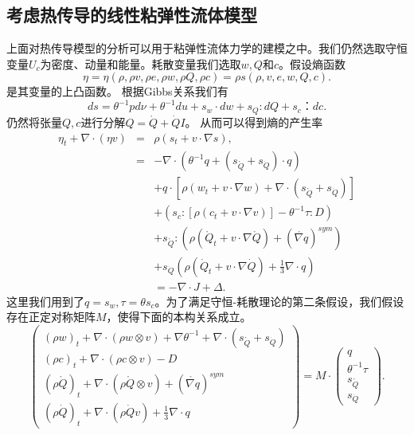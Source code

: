 \documentclass{article}
\begin{document}
\subsection{考虑热传导的线性粘弹性流体模型}
上面对热传导模型的分析可以用于粘弹性流体力学的建模之中。我们仍然选取守恒变量$U_c$为密度、动量和能量。耗散变量我们选取$w,Q$和$c$。假设熵函数
\begin{equation*}
	\eta = \eta (\rho,\rho v,\rho e,\rho w,\rho Q,\rho c) = \rho s(\rho,v,e,w,Q,c).
\end{equation*}
是其变量的上凸函数。
根据Gibbs关系我们有
\begin{equation*}
			ds = \theta^{-1} pd\nu + \theta^{-1} du + s_w \cdot dw + s_Q : d Q+ s_c ：dc.
\end{equation*}
仍然将张量$Q,c$进行分解$Q = \mathring{Q} +\dot{Q}I$。
从而可以得到熵的产生率
\begin{eqnarray*}
		\eta_t + \nabla \cdot (\eta v) &=& \rho (s_t + v \cdot \nabla s), \\
		&=& -\nabla \cdot (\theta^{-1} q + (s_{\mathring{{Q}}}+s_{\dot{Q}}) \cdot {q} )  \\
		&&+ q \cdot [\rho (w_t + v \cdot \nabla w) + \nabla \cdot (s_{\mathring{{Q}}}+s_{\dot{Q}})] \\
		&&+ (s_c:[\rho (c_t + v \cdot \nabla v)] - \theta^{-1} \tau : D) \\
		&&+s_{\mathring{{Q}}}:(\rho (\mathring{{Q}}_t + v \cdot \nabla \mathring{Q})+(\mathring{\nabla {q}})^{sym}) \\
		&&+s_{\dot{Q}}(\rho (\dot{Q}_t + v \cdot \nabla \dot{Q})+\frac{1}{3}\nabla \cdot {q}) \\
		&& = -\nabla \cdot J + \Delta. 
\end{eqnarray*}
这里我们用到了$q=s_w,\tau = \theta s_c$。为了满足守恒-耗散理论的第二条假设，我们假设存在正定对称矩阵$M$，使得下面的本构关系成立。
\begin{equation*}
   	\left( \begin{array}{c} 
			(\rho w)_t +  \nabla \cdot (\rho w \otimes v)  + \nabla \theta^{-1} + \nabla \cdot (s_{\mathring{{Q}}}+s_{\dot{Q}})\\
			(\rho c)_t +  \nabla \cdot (\rho c \otimes v)  - D \\
			(\rho \mathring{{Q}})_t + \nabla \cdot (\rho \mathring{Q} \otimes v)+(\mathring{\nabla {q}})^{sym} \\ (\rho \dot{Q})_t + \nabla \cdot (\rho \dot{Q} v)+\frac{1}{3} \nabla \cdot {q}
		\end{array} \right) = M \cdot
		\left( \begin{array}{c} 
			q \\ \theta^{-1} \tau \\s_{\mathring{{Q}}} \\s_{\dot{Q}}
		\end{array}\right).
\end{equation*} 
\end{document}
